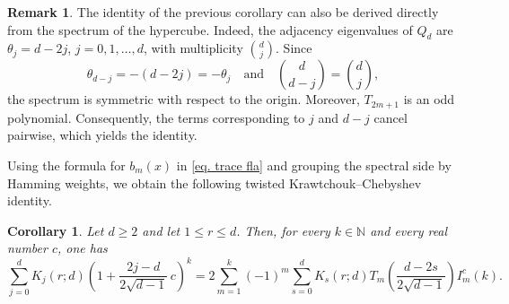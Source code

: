 \documentclass[reqno,10pt]{amsart}
\newtheorem{corollary}[theorem]{Corollary}
\theoremstyle{definition}
\newtheorem{remark}[theorem]{Remark}
\numberwithin{equation}{section}
\begin{document}

\begin{remark}
The identity of the previous corollary can also be derived directly from
the spectrum of the hypercube. Indeed, the adjacency eigenvalues of $Q_d$
are $\theta_j=d-2j$, $j=0,1,\ldots,d$, with multiplicity $\binom{d}{j}$. Since
\[
\theta_{d-j}=-(d-2j)=-\theta_j \quad \text{and} \quad \binom{d}{d-j}=\binom{d}{j},
\]
the spectrum is symmetric with respect to the origin. Moreover,
$T_{2m+1}$ is an odd polynomial. Consequently, the terms corresponding to $j$ and $d-j$ cancel pairwise, which yields the identity.
\end{remark}

Using the formula for $b_m(x)$ in \eqref{eq. trace fla} and
grouping the spectral side by Hamming weights, we obtain the following
twisted Krawtchouk--Chebyshev identity.

\begin{corollary}\label{cor:Qd_twisted}
Let $d\ge2$ and let $1\le r\le d$. Then, for every $k\in\mathbb N$ and every real number $c$, one has
\begin{equation} \label{Qd_twisted}
    \sum_{j=0}^{d}
K_j(r;d)
\left(
1+\frac{2j-d}{2\sqrt{d-1}}\,c
\right)^k
=
2
\sum_{m=1}^{k}
(-1)^m
\sum_{s=0}^{d}
K_s(r;d)
T_m\!\left(
\frac{d-2s}{2\sqrt{d-1}}
\right)
I_m^{c}(k).
\end{equation}
\end{corollary}
\end{document}
